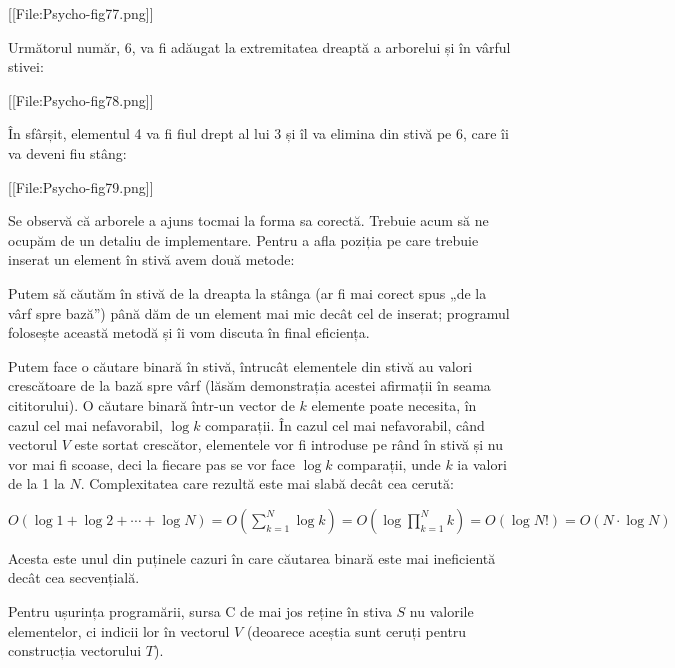 [[File:Psycho-fig77.png]]

Următorul număr, 6, va fi adăugat la extremitatea dreaptă a arborelui și în vârful stivei:

[[File:Psycho-fig78.png]]

În sfârșit, elementul 4 va fi fiul drept al lui 3 și îl va elimina din stivă pe 6, care îi va deveni fiu stâng:

[[File:Psycho-fig79.png]]

Se observă că arborele a ajuns tocmai la forma sa corectă. Trebuie acum să ne ocupăm de un detaliu de implementare. Pentru a afla poziția pe care trebuie inserat un element în stivă avem două metode: 

\item Putem să căutăm în stivă de la dreapta la stânga (ar fi mai corect spus „de la vârf spre bază”) până dăm de un element mai mic decât cel de inserat; programul folosește această metodă și îi vom discuta în final eficiența.
\item Putem face o căutare binară în stivă, întrucât elementele din stivă au valori crescătoare de la bază spre vârf (lăsăm demonstrația acestei afirmații în seama cititorului). O căutare binară într-un vector de $k$ elemente poate necesita, în cazul cel mai nefavorabil, $\log k$ comparații. În cazul cel mai nefavorabil, când vectorul $V$ este sortat crescător, elementele vor fi introduse pe rând în stivă și nu vor mai fi scoase, deci la fiecare pas se vor face $\log k$ comparații, unde $k$ ia valori de la 1 la $N$. Complexitatea care rezultă este mai slabă decât cea cerută:

$
O(\log 1 + \log 2 + \cdots + \log N) = O(\sum_{k = 1}^{N} \log k) = O(\log \prod_{k = 1}^{N} k) = O(\log N!) = O(N \cdot \log N)
$

Acesta este unul din puținele cazuri în care căutarea binară este mai ineficientă decât cea secvențială.

Pentru ușurința programării, sursa C de mai jos reține în stiva $S$ nu valorile elementelor, ci indicii lor în vectorul $V$ (deoarece aceștia sunt ceruți pentru construcția vectorului $T$).

